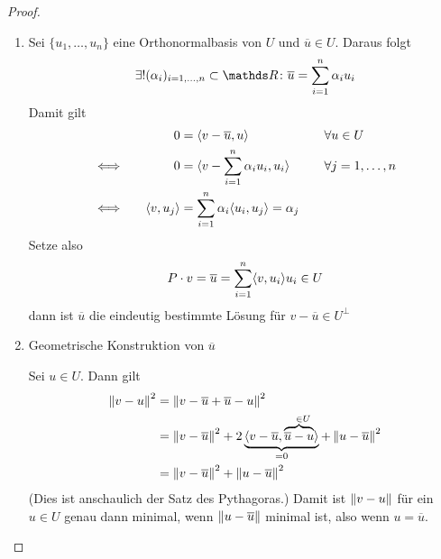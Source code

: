 \begin{proof}~
  \begin{enumerate}[1)]
  \item Sei $\{u_1, \dotsc , u_n \}$ eine Orthonormalbasis von $U$ 
    und $\overline{u}\in U $.
    Daraus folgt
    \begin{gather*}
      \exists !(\alpha_i)_{i=1,\dotsc,n} \subset \R\colon \overline{u} = \sum_{i=1}^{n} \alpha_i u_i
    \end{gather*}
    Damit gilt
    \begin{alignat*}{3}
      &&0 &= \scp{v-\overline{u}}{u} &\quad& \forall u \in U \\
      &\Longleftrightarrow \quad& 0 &= \scp{v- \sum_{i=1}^{n} \alpha_i u_i}{u_i} &\quad &\forall j=1, \dotsc , n\\
      &\Longleftrightarrow  & \scp{v}{u_j} &= \sum_{i=1}^{n} \alpha_i \scp{u_i}{u_j} = \alpha_j
    \end{alignat*}
    Setze also 
    \begin{gather}
      P\cdot v = \overline{u}
      = \sum_{i=1}^{n} \scp{v}{u_i} u_i \in U
      \label{IV.3.4}
    \end{gather}
    dann ist $\overline{u}$ die eindeutig bestimmte Lösung für $ v-\overline{u} \in U^\bot$
  \item
    \begin{image}{Geometrische Konstruktion von $\overline{u}$}
    \end{image}
    Sei  $u\in U$. Dann gilt
    \begin{align}
      \nonumber
      \nn[v-u]^2 &= \nn[v-\overline{u}+\overline{u} -u]^2 \\ \nonumber
                 &= \nn[v-\overline{u}]^2 +
                   2\underbrace{\scp{v-\overline{u}}{\overbrace{\overline{u}-u}^{~~\in U}}}_{=0}
                   + \nn[u-\overline{u}]^2 \\
                 &= \nn[v-\overline{u}]^2 + \nn[u-\overline{u}]^2
                   \label{IV.3.5}
    \end{align}
    (Dies ist anschaulich der Satz des Pythagoras.)
    Damit ist $\nn[v-u]$ für ein $u\in U$ genau dann minimal, 
    wenn $\nn[u-\overline{u}]$ minimal ist,
    also wenn $u=\overline{u}$.
  \end{enumerate}
\end{proof}


